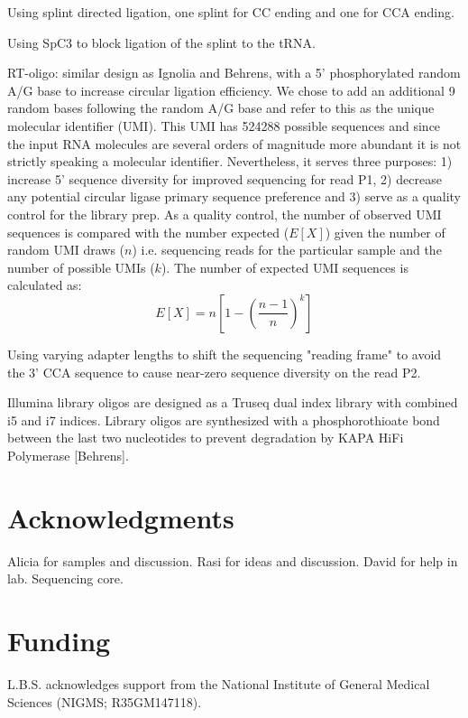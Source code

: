 \documentclass[9pt,lineno]{elife}
\begin{document}
Using splint directed ligation, one splint for CC ending and one for CCA ending.

Using SpC3 to block ligation of the splint to the tRNA.

RT-oligo: similar design as Ignolia and Behrens, with a 5' phosphorylated random A/G base to increase circular ligation efficiency.
We chose to add an additional 9 random bases following the random A/G base and refer to this as the unique molecular identifier (UMI).
This UMI has 524288 possible sequences and since the input RNA molecules are several orders of magnitude more abundant it is not strictly speaking a molecular identifier.
Nevertheless, it serves three purposes: 1) increase 5' sequence diversity for improved sequencing for read P1, 2) decrease any potential circular ligase primary sequence preference and 3) serve as a quality control for the library prep.
As a quality control, the number of observed UMI sequences is compared with the number expected ($E[X]$) given the number of random UMI draws ($n$) i.e. sequencing reads for the particular sample and the number of possible UMIs ($k$).
The number of expected UMI sequences is calculated as:
$$
E[X] = n \left[ 1 - \left(\frac{n-1}{n} \right)^k \right]
$$


Using varying adapter lengths to shift the sequencing "reading frame"  to avoid the 3' CCA sequence to cause near-zero sequence diversity on the read P2.

Illumina library oligos are designed as a Truseq dual index library with combined i5 and i7 indices.
Library oligos are synthesized with a phosphorothioate bond between the last two nucleotides to prevent degradation by KAPA HiFi Polymerase [Behrens].






\section{Acknowledgments}
Alicia for samples and discussion.
Rasi for ideas and discussion.
David for help in lab.
Sequencing core.

\section{Funding}
L.B.S. acknowledges support from the National Institute of General Medical Sciences (NIGMS; R35GM147118).



\end{document}
